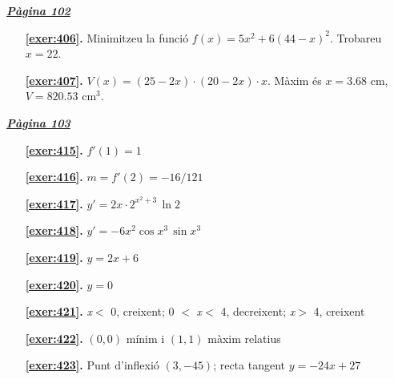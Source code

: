 
\hyperlink{page.102}{\textbf{\em Pàgina 102}}
\begin{enumerate}
\item[\fontfamily{phv}\selectfont\color{blue}\textbf{\ref{exer:406}. }] \label{ans:406} 
Minimitzeu la funció $f(x)=5x^2+6(44-x)^2$. Trobareu $x=22$.
 \end{enumerate}
\begin{enumerate}
\item[\fontfamily{phv}\selectfont\color{blue}\textbf{\ref{exer:407}. }] \label{ans:407} 
$V(x)=(25-2x)\cdot (20-2x)\cdot x$. Màxim és $x=3.68$ cm, $V=820.53$ cm$^{3}$.
 \end{enumerate}
\vspace{0.3cm}


\hyperlink{page.103}{\textbf{\em Pàgina 103}}
\begin{enumerate}
\item[\fontfamily{phv}\selectfont\color{blue}\textbf{\ref{exer:415}. }] \label{ans:415} 
$f'(1)=1$
 \end{enumerate}
\begin{enumerate}
\item[\fontfamily{phv}\selectfont\color{blue}\textbf{\ref{exer:416}. }] \label{ans:416} 
$m=f'(2)=-16/121$
\item[\fontfamily{phv}\selectfont\color{blue}\textbf{\ref{exer:417}. }] \label{ans:417} 
$y'=2x \cdot 2^{x^2+3} \, \ln 2$ 
\item[\fontfamily{phv}\selectfont\color{blue}\textbf{\ref{exer:418}. }] \label{ans:418} 
$y'=-6x^2\cos x^3 \, \sin x^3 $
\item[\fontfamily{phv}\selectfont\color{blue}\textbf{\ref{exer:419}. }] \label{ans:419} 
$y = 2x + 6$
\item[\fontfamily{phv}\selectfont\color{blue}\textbf{\ref{exer:420}. }] \label{ans:420} 
$y=0$
\item[\fontfamily{phv}\selectfont\color{blue}\textbf{\ref{exer:421}. }] \label{ans:421} 
\textit {x}$<$ 0, creixent; 0 $<$ \textit {x}$<$ 4, decreixent; \textit {x}$>$ 4, creixent
\item[\fontfamily{phv}\selectfont\color{blue}\textbf{\ref{exer:422}. }] \label{ans:422} 
$(0, 0)$ mínim i $(1, 1)$ màxim relatius
\item[\fontfamily{phv}\selectfont\color{blue}\textbf{\ref{exer:423}. }] \label{ans:423} 
Punt d'inflexió $(3, -45)$; recta tangent $y=-24x+27$
 \end{enumerate}

